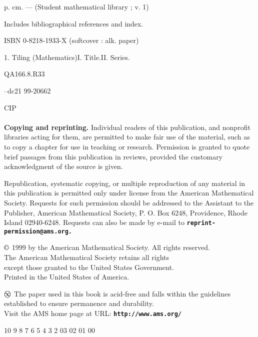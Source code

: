 \documentclass[reqno]{stml-l}
\theoremstyle{plain}
\newcommand\circledinfty{\ooalign{$\bigcirc$\cr$\infty$\cr}\space}
\newenvironment{copyrightpage}{\clearpage\null\thispagestyle{empty}}{\thispagestyle{empty}\clearpage}
\theoremstyle{definition}
\numberwithin{equation}{chapter}
\begin{document}
\begin{copyrightpage}
\quad p. \quad cm. --- (Student mathematical library ; v. 1)

Includes bibliographical references and index.

ISBN 0-8218-1933-X (softcover : alk. paper)

1. Tiling (Mathematics)\quad I. Title.\quad II. Series.

\noindent QA166.8.R33 

--dc21 \hfill 99-20662

\hfill CIP\\

\hrulefill\\

\textbf{Copying and reprinting.} Individual readers of this
publication, and nonprofit libraries acting for them, are permitted
to make fair use of the material, such as to copy a chapter for use
in teaching or research. Permission is granted to quote brief
passages from this publication in reviews, provided the customary
acknowledgment of the source is given.

Republication, systematic copying, or multiple reproduction of any material in this publication is permitted only under license from the American Mathematical Society. Requests for such permission should be addressed to the Assistant to the Publisher, American Mathematical Society, P. O. Box 6248, Providence, Rhode Island 02940-6248. Requests can also be made by e-mail to \textbf{\texttt{reprint-permission@ams.org.}}\\

\begin{center}
$\copyright$ 1999 by the American Mathematical Society. All rights reserved.\\
The American Mathematical Society retains all rights\\
except those granted to the United States Government.\\
Printed in the United States of America.
\end{center}

\begin{center}
$\circledinfty$ The paper used in this book is acid-free and falls within the guidelines\\
established to ensure permanence and durability.\\
Visit the AMS home page at URL: \textbf{\texttt{http://www.ams.org/}}
\end{center}

\begin{center}
10 9 8 7 6 5 4 3 2  03 02 01 00
\end{center}
\end{copyrightpage}
\end{document}
